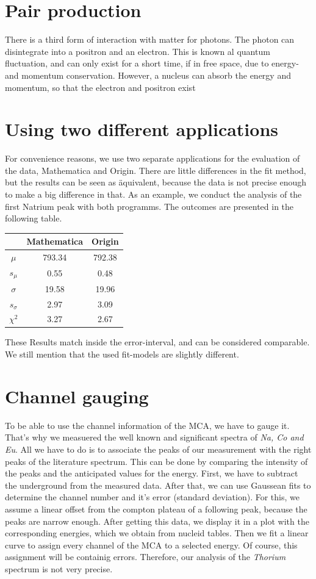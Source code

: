 \documentclass[10pt,a4paper]{article}
\begin{document}
\section{Pair production}
There is a third form of interaction with matter for photons. The photon can disintegrate into a positron and an electron. This is known al quantum fluctuation, and can only exist for a short time, if in free space, due to energy- and momentum conservation. However, a nucleus can absorb the energy and momentum, so that the electron and positron exist 

\section*{Using two different applications}
For convenience reasons, we use two separate applications for the evaluation of the data, Mathematica and Origin. There are little differences in the fit method, but the results can be seen as äquivalent, because the data is not precise enough to make a big difference in that. As an example, we conduct the analysis of the first Natrium peak with both programms. The outcomes are presented in the following table.

\begin{tabular}{|c|c|c|}
\hline
 & Mathematica & Origin \\
\hline 
$\mu $ & 793.34 & 792.38 \\ 
\hline 
$s_{\mu} $ & 0.55 & 0.48 \\ 
\hline
$\sigma$ & 19.58 & 19.96 \\
\hline
$s_{\sigma}$ & 2.97 & 3.09 \\ 
\hline
$\chi^{2}$ & 3.27 & 2.67 \\
\hline
\end{tabular} 

These Results match inside the error-interval, and can be considered comparable. We still mention that the used fit-models are slightly different.

\section*{Channel gauging}
To be able to use the channel information of the MCA, we have to gauge it. That's why we measuered the well known and significant spectra of \textit{Na, Co and Eu}. All we have to do is to associate the peaks of our measurement with the right peaks of the literature spectrum. This can be done by comparing the intensity of the peaks and the anticipated values for the energy. First, we have to subtract the underground from the measured data. After that, we can use Gaussean fits to determine the channel number and it's error (standard deviation). For this, we assume a linear offset from the compton plateau of a following peak, because the peaks are narrow enough. After getting this data, we display it in a plot with the corresponding energies, which we obtain from nucleid tables. Then we fit a linear curve to assign every channel of the MCA to a selected energy. Of course, this assignment will be containig errors. Therefore, our analysis of the \textit{Thorium} spectrum is not very precise. 
\end{document}
